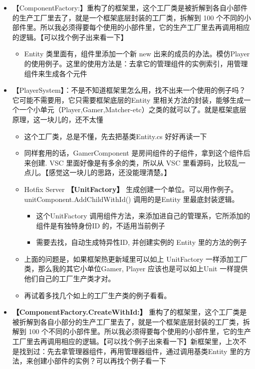 \documentclass[9pt, b5paper]{article}
\begin{document}
\begin{itemize}
\item 【ComponentFactory:】重构了的框架里，这个工厂类是被折解到各自小部件的生产工厂里去了，就是一个框架底层封装的工厂类，拆解到 100 个不同的小部件里。所以我必须得要每个使用的小部件里，它的生产工厂里去再调用相应的逻辑。【可以找个例子出来看一下】
\begin{itemize}
\item Entity 类里面有，组件里添加一个新 new 出来的成员的办法。模仿Player 的使用例子。这里的使用方法是：去拿它的管理组件的实例索引，用管理组件来生成各个元件
\end{itemize}
\item 【PlayerSystem】：不是不知道框架里怎么用，找不出来一个使用的例子吗？它可能不需要用，它只需要框架底层的Entity 里相关方法的封装，能够生成一个一个小单元（Player,Gamer,Matcher-etc）之类的就可以了。就是框架底层原理，这一块儿的，还不太懂
\begin{itemize}
\item 这个工厂类，总是不懂，先去把基类Entity.cs 好好再读一下
\item 同样套用的话，GamerComponent 是房间组件的子组件，拿到这个组件后来创建. VSC 里面好像是有多余的类，所以从 VSC 里看源码，比较乱一点儿。【感觉这一块儿的思路，还没能理清楚。】
\item Hotfix Server \textbf{【UnitFactory】} 生成创建一个单位。可以用作例子。unitComponent.AddChildWithId() 调用的是Entity 里最底封装逻辑。
\begin{itemize}
\item 这个UnitFactory 调用组件方法，来添加进自己的管理系，它所添加的组件是有独特身份ID 的，不适用当前例子
\item 需要去找，自动生成特异性ID, 并创建实例的 Entity 里的方法的例子
\end{itemize}
\item 上面的问题是，如果框架热更新域里可以如上 UnitFactory 一样添加工厂类，那么我的其它小单位Gamer, Player 应该也是可以如上Unit 一样提供他们自己的工厂生产类才对。
\item 再试着多找几个如上的工厂生产类的例子看看。
\end{itemize}
\item \textbf{【ComponentFactory.CreateWithId:】} 重构了的框架里，这个工厂类是被折解到各自小部分的生产工厂里去了，就是一个框架底层封装的工厂类，拆解到 100 个不同的小部件里。所以我必须得要每个使用的小部件里，它的生产工厂里去再调用相应的逻辑。【可以找个例子出来看一下】新框架里，上次不是找到过：先去拿管理器组件，再用管理器组件，通过调用基类Entity 里的方法，来创建小部件的实例？可以再找个例子看一下

\end{itemize}
\end{document}
